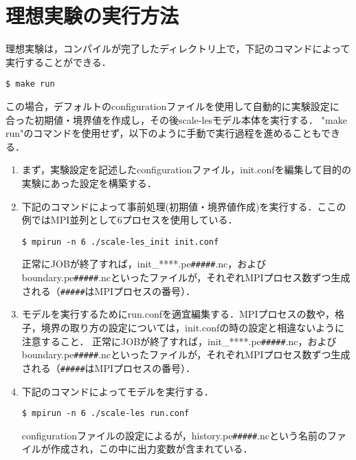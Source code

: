 \section{理想実験の実行方法}
理想実験は，コンパイルが完了したディレクトリ上で，下記のコマンドによって
実行することができる．
\begin{verbatim}
$ make run
\end{verbatim}
この場合，デフォルトのconfigurationファイルを使用して自動的に実験設定に
合った初期値・境界値を作成し，その後scale-lesモデル本体を実行する．
"make run"のコマンドを使用せず，以下のように手動で実行過程を進めることもできる．

\begin{enumerate}
\item まず，実験設定を記述したconfigurationファイル，init.confを編集して目的の実験にあった設定を構築する．

\item 下記のコマンドによって事前処理(初期値・境界値作成)を実行する．ここの例ではMPI並列として6プロセスを使用している．
\begin{verbatim}
$ mpirun -n 6 ./scale-les_init init.conf
\end{verbatim}
正常にJOBが終了すれば，init\_****.pe\verb|#####|.nc，およびboundary.pe\verb|#####|.ncといったファイルが，それぞれMPIプロセス数ずつ生成される（\verb|#####|はMPIプロセスの番号）．

\item モデルを実行するためにrun.confを適宜編集する．MPIプロセスの数や，格子，境界の取り方の設定については，init.confの時の設定と相違ないように注意すること．
正常にJOBが終了すれば，init\_****.pe\verb|#####|.nc，およびboundary.pe\verb|#####|.ncといったファイルが，それぞれMPIプロセス数ずつ生成される（\verb|#####|はMPIプロセスの番号）．

\item 下記のコマンドによってモデルを実行する．
\begin{verbatim}
$ mpirun -n 6 ./scale-les run.conf
\end{verbatim}
configurationファイルの設定によるが，history.pe\verb|#####|.ncという名前のファイルが作成され，この中に出力変数が含まれている．
\end{enumerate}

